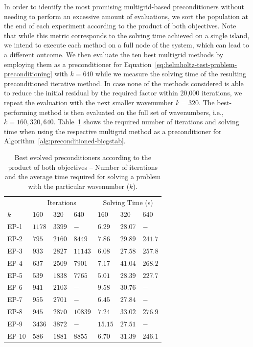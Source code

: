 In order to identify the most promising multigrid-based preconditioners without needing to perform an excessive amount of evaluations, we sort the population at the end of each experiment according to the product of both objectives.
Note that while this metric corresponds to the solving time achieved on a single island, we intend to execute each method on a full node of the system, which can lead to a different outcome.
We then evaluate the ten best multigrid methods by employing them as a preconditioner for Equation~\eqref{eq:helmholtz-test-problem-preconditioning} with $k = 640$ while we measure the solving time of the resulting preconditioned iterative method.
In case none of the methods considered is able to reduce the initial residual by the required factor within 20,000 iterations, we repeat the evaluation with the next smaller wavenumber $k = 320$.
The best-performing method is then evaluated on the full set of wavenumbers, i.e., $k = 160, 320, 640$.
Table~\ref{table:evolved-solvers} shows the required number of iterations and solving time when using the respective multigrid method as a preconditioner for Algorithm~\ref{alg:preconditioned-bicgstab}.
\begin{table}
	\caption[2D Helmholtz -- Number of iterations and solving time of the best evolved methods]{Best evolved preconditioners according to the product of both objectives -- Number of iterations and the average time required for solving a problem with the particular wavenumber ($k$).}
	\label{table:evolved-solvers}
	\centering
	\begin{tabular}{l l l l l l l }
		\toprule
		& \multicolumn{3}{c}{Iterations} & \multicolumn{3}{c}{Solving Time (s)} \\
		\cmidrule(l){2-4} \cmidrule(l){5-7}
		$k$ & $160$ & $320$ & $640$ & $160$ & $320$ & $640$ \\
		\midrule
		EP-1 & $1178$ & $3399$ & $-$ & $6.29$ & $28.07$ & $-$ \\
		\midrule
		EP-2 & $795$ & $2160$ & $8449$ & $7.86$ & $29.89$ & $241.7$\\
		\midrule
		EP-3 & $933$ & $2827$ & $11143$ & $6.08$ & $27.58$ & $257.8$ \\
		\midrule
		EP-4 & $637$ & $2509$ & $7901$ & $7.17$& $41.04$ & $268.2$ \\
		\midrule
		EP-5 & $539$ & $1838$ & $7765$ & $5.01$ & $28.39$ & $227.7$ \\
		\midrule
		EP-6 & $941$ & $2103$ & $-$ & $9.58$ & $30.76$ & $-$ \\
		\midrule
		EP-7 & $955$ & $2701$ & $-$  & $6.45$& $27.84$ & $-$ \\
		\midrule
		EP-8 & $945$ & $2870$ & $10839$ & $7.24$ & $33.02$ & $276.9$ \\
		\midrule
		EP-9 & $3436$ & $3872$ & $-$  & $15.15$ & $27.51$ & $-$ \\
		\midrule
		EP-10 & $586$ & $1881$ & $8855$ & $6.70$ & $31.39$ & $246.1$ \\
		\bottomrule
	\end{tabular}
\end{table}
